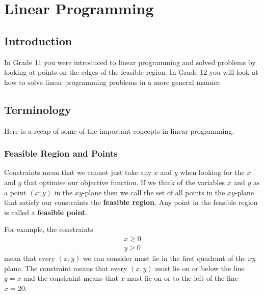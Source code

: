 \chapter{Linear Programming}
\label{m:lp12}



\section{Introduction}
In Grade 11 you were introduced to linear programming and solved problems by looking at points on the edges of the feasible region. In Grade 12 you will look at how to solve linear programming problems in a more general manner.

\section{Terminology}
Here is a recap of some of the important concepts in linear programming.

\subsection{Feasible Region and Points}
Constraints mean that we cannot just take any $x$ and $y$ when looking for the $x$ and $y$ that optimise our objective function. If we think of the variables $x$ and $y$ as a point $(x;y)$ in the $xy$-plane then we call the set of all points in the $xy$-plane that satisfy our constraints the \textbf{feasible region}. Any point in the feasible region is called a \textbf{feasible point}.

For example, the constraints
\begin{eqnarray*}
x\geq 0\\
y\geq 0
\end{eqnarray*}
mean that every $(x,y)$ we can consider must lie in the first quadrant of the $xy$ plane. The constraint
means that every $(x,y)$ must lie on or below the line $y=x$ and the constraint
means that $x$ must lie on or to the left of the line $x=20$. 

